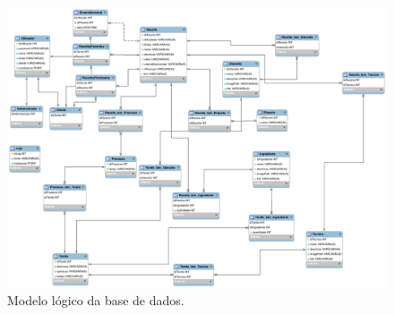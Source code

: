 \begin{figure}[ht]
  \centering
  \includegraphics[width=\textwidth]{figures/09/sbd-logico.png}
  \caption{Modelo lógico da base de dados.}
  \label{fig:logicoooooooooo}
\end{figure}

